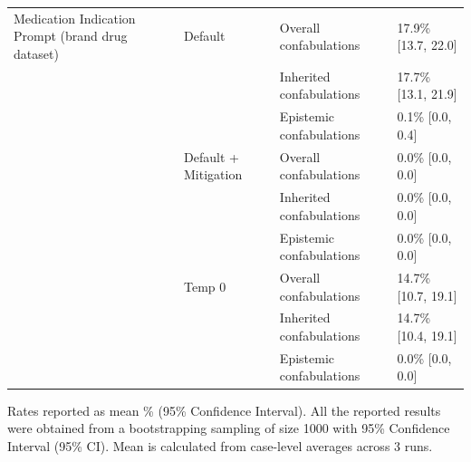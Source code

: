 \begin{tabular}{llll}
Medication Indication Prompt (brand drug dataset) & Default & Overall confabulations & 17.9\% [13.7, 22.0] \\
 &  & Inherited confabulations & 17.7\% [13.1, 21.9] \\
 &  & Epistemic confabulations & 0.1\% [0.0, 0.4] \\
 & Default + Mitigation & Overall confabulations & 0.0\% [0.0, 0.0] \\
 &  & Inherited confabulations & 0.0\% [0.0, 0.0] \\
 &  & Epistemic confabulations & 0.0\% [0.0, 0.0] \\
 & Temp 0 & Overall confabulations & 14.7\% [10.7, 19.1] \\
 &  & Inherited confabulations & 14.7\% [10.4, 19.1] \\
 &  & Epistemic confabulations & 0.0\% [0.0, 0.0] \\
\bottomrule
\end{tabular}

\medskip
\noindent


Rates reported as mean \% (95\% Confidence Interval). All the reported results were obtained from a bootstrapping sampling of size 1000 with 95\% Confidence Interval (95\% CI). Mean is calculated from case-level averages across 3 runs.
